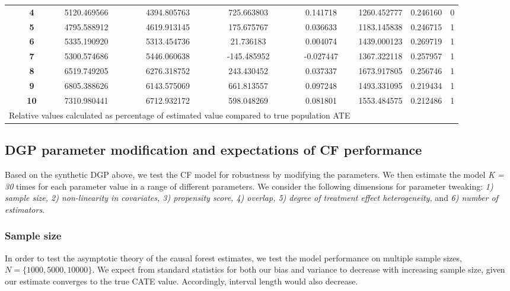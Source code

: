 \documentclass[12pt]{article}
\begin{document}
\begin{table}[H]
{\begin{tabular}{lc|ccccccc}
\addlinespace
&\textbf{4} &5120.469566 & 4394.805763 & 725.663803 & 0.141718 & 1260.452777 & 0.246160 & 0 \\
\addlinespace
&\textbf{5} & 4795.588912 & 4619.913145 & 175.675767 & 0.036633 & 1183.145838 & 0.246715 & 1 \\
\addlinespace
&\textbf{6} & 5335.190920 & 5313.454736 & 21.736183 & 0.004074 & 1439.000123 & 0.269719 & 1 \\
\addlinespace
&\textbf{7} & 5300.574686 & 5446.060638 & -145.485952 & -0.027447 & 1367.322118 & 0.257957 & 1 \\\addlinespace
&\textbf{8} &6519.749205 & 6276.318752 & 243.430452 & 0.037337 & 1673.917805 & 0.256746 & 1 \\\addlinespace
&\textbf{9} & 6805.388626 & 6143.575069 & 661.813557 & 0.097248 & 1493.331095 & 0.219434 & 1 \\
\addlinespace
&\textbf{10} & 7310.980441 & 6712.932172 & 598.048269 & 0.081801 & 1553.484575 & 0.212486 & 1\\
\bottomrule
\multicolumn{6}{p{\textwidth}}{\footnotesize Relative values calculated as percentage of estimated value compared to true population ATE}\\
\end{tabular}}
\end{table}




\subsection{DGP parameter modification and expectations of CF performance}

Based on the synthetic DGP above, we test the CF model for robustness by
modifying the parameters. We then estimate the model \textit{K = 30} times for
each parameter value in a range of different parameters. We consider the
following dimensions for parameter tweaking: \textit{1) sample size, 2)
non-linearity in covariates, 3) propensity score, 4) overlap, 5) degree of
treatment effect heterogeneity,} and \textit{6) number of estimators}. 

\subsubsection{Sample size} 
In order to test the asymptotic theory of the causal forest estimates, we test
the model performance on multiple sample sizes, $ N = \{1000, 5000, 10000\}$. We
expect from standard statistics for both our bias and variance to decrease with
increasing sample size, given our estimate converges to the true CATE value.
Accordingly, interval length would also decrease.
\end{document}
